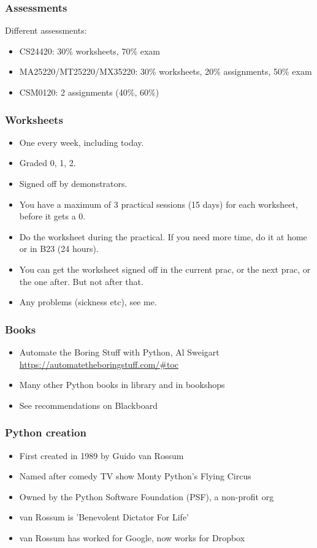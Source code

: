 \documentclass{beamer}
\begin{document}
\begin{frame}
\frametitle{Assessments}
Different assessments:
\begin{itemize}
\item CS24420: 30\% worksheets, 70\% exam
\item MA25220/MT25220/MX35220: 30\% worksheets, 20\% assignments, 50\% exam
\item CSM0120: 2 assignments (40\%, 60\%) 
\end{itemize}
\end{frame}

\begin{frame}
\frametitle{Worksheets}
\begin{itemize}
\item One every week, including today.
\item Graded 0, 1, 2.
\item Signed off by demonstrators.
\item You have a maximum of 3 practical sessions (15 days) for each
  worksheet, before it gets a 0.
\item Do the worksheet during the practical. If you need more time, do
  it at home or in B23 (24 hours). 
\item You can get the worksheet signed off in the current prac, or the
  next prac, or the one after. But not after that.
\item Any problems (sickness etc), see me.
\end{itemize}
\end{frame}


\begin{frame}
\frametitle{Books}
\begin{itemize}
\item Automate the Boring Stuff with Python, Al Sweigart 
    \url{https://automatetheboringstuff.com/\#toc}
\item Many other Python books in library and in bookshops
\item See recommendations on Blackboard
\end{itemize}
\end{frame}

\begin{frame}
\frametitle{Python creation}
\begin{itemize}
\item First created in 1989 by Guido van Rossum
\item Named after comedy TV show Monty Python's Flying Circus
\item Owned by the Python Software Foundation (PSF), a non-profit org
\item van Rossum is 'Benevolent Dictator For Life'
\item van Rossum has worked for Google, now works for Dropbox
\end{itemize}
\end{frame}
\end{document}
